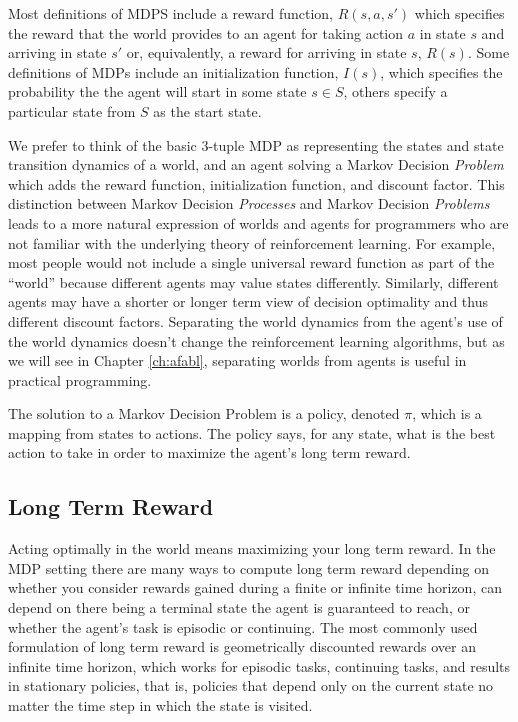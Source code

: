 Most definitions of MDPS include a reward function, $R(s, a, s')$ which specifies the reward that the world provides to an agent for taking action $a$ in state $s$ and arriving in state $s'$ or, equivalently, a reward for arriving in state $s$, $R(s)$. Some definitions of MDPs include an initialization function, $I(s)$, which specifies the probability the the agent will start in some state $s \in S$, others specify a particular state from $S$ as the start state.

We prefer to think of the basic 3-tuple MDP as representing the states and state transition dynamics of a world, and an agent solving a Markov Decision {\it Problem} which adds the reward function, initialization function, and discount factor. This distinction between Markov Decision {\it Processes} and Markov Decision {\it Problems} leads to a more natural expression of worlds and agents for programmers who are not familiar with the underlying theory of reinforcement learning. For example, most people would not include a single universal reward function as part of the ``world'' because different agents may value states differently. Similarly, different agents may have a shorter or longer term view of decision optimality and thus different discount factors. Separating the world dynamics from the agent's use of the world dynamics doesn't change the reinforcement learning algorithms, but as we will see in Chapter \ref{ch:afabl}, separating worlds from agents is useful in practical programming.

The solution to a Markov Decision Problem is a policy, denoted $\pi$, which is a mapping from states to actions. The policy says, for any state, what is the best action to take in order to maximize the agent's long term reward.

\subsection{Long Term Reward}

Acting optimally in the world means maximizing your long term reward. In the MDP setting there are many ways to compute long term reward depending on whether you consider rewards gained during a finite or infinite time horizon, can depend on there being a terminal state the agent is guaranteed to reach, or whether the agent's task is episodic or continuing. The most commonly used formulation of long term reward is geometrically discounted rewards over an infinite time horizon, which works for episodic tasks, continuing tasks, and results in stationary policies, that is, policies that depend only on the current state no matter the time step in which the state is visited.

